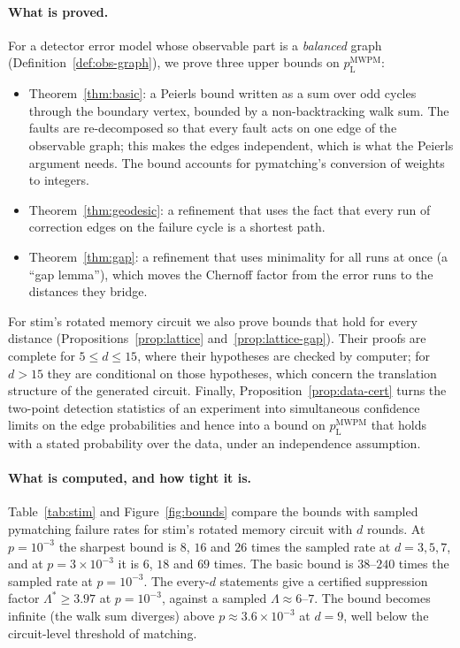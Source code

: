 \documentclass[11pt]{article}
\theoremstyle{plain}
\theoremstyle{definition}
\theoremstyle{remark}
\newcommand{\pM}{p_{\mathrm{L}}^{\mathrm{MWPM}}}
\renewcommand{\_}{\oldunderscore\allowbreak}
\begin{document}
\paragraph{What is proved.}
For a detector error model whose observable part is a \emph{balanced} graph (Definition~\ref{def:obs-graph}), we prove three upper bounds on $\pM$:
\begin{itemize}[leftmargin=*,itemsep=2pt]
\item Theorem~\ref{thm:basic}: a Peierls bound written as a sum over odd cycles through the boundary vertex, bounded by a non-backtracking walk sum. The faults are re-decomposed so that every fault acts on one edge of the observable graph; this makes the edges independent, which is what the Peierls argument needs. The bound accounts for pymatching's conversion of weights to integers.
\item Theorem~\ref{thm:geodesic}: a refinement that uses the fact that every run of correction edges on the failure cycle is a shortest path.
\item Theorem~\ref{thm:gap}: a refinement that uses minimality for all runs at once (a ``gap lemma''), which moves the Chernoff factor from the error runs to the distances they bridge.
\end{itemize}
For stim's rotated memory circuit we also prove bounds that hold for every distance (Propositions~\ref{prop:lattice} and~\ref{prop:lattice-gap}). Their proofs are complete for $5\le d\le15$, where their hypotheses are checked by computer; for $d>15$ they are conditional on those hypotheses, which concern the translation structure of the generated circuit. Finally, Proposition~\ref{prop:data-cert} turns the two-point detection statistics of an experiment into simultaneous confidence limits on the edge probabilities and hence into a bound on $\pM$ that holds with a stated probability over the data, under an independence assumption.

\paragraph{What is computed, and how tight it is.}
Table~\ref{tab:stim} and Figure~\ref{fig:bounds} compare the bounds with sampled pymatching failure rates for stim's rotated memory circuit with $d$ rounds. At $p=10^{-3}$ the sharpest bound is $8$, $16$ and $26$ times the sampled rate at $d=3,5,7$, and at $p=3\times10^{-3}$ it is $6$, $18$ and $69$ times. The basic bound is $38$--$240$ times the sampled rate at $p=10^{-3}$. The every-$d$ statements give a certified suppression factor $\Lambda^\ast\ge3.97$ at $p=10^{-3}$, against a sampled $\Lambda\approx6$--$7$. The bound becomes infinite (the walk sum diverges) above $p\approx3.6\times10^{-3}$ at $d=9$, well below the circuit-level threshold of matching.
\end{document}
